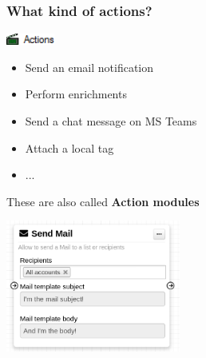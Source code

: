 \begin{frame}
    \frametitle{What kind of actions?}
    \vspace*{0.25em}
    \includegraphics[width=60px]{pictures/sc-action.png}
    \vspace*{0.25em}
    \begin{itemize}
        \item Send an email notification
        \item Perform enrichments
        \item Send a chat message on MS Teams
        \item Attach a local tag
        \item ...
    \end{itemize}

    \vspace*{0.5em}
    {\Large {}} These are also called \textbf{Action modules}
    \begin{center}
        \includegraphics[width=0.43\textwidth]{pictures/action-module.png}
    \end{center}
\end{frame}

